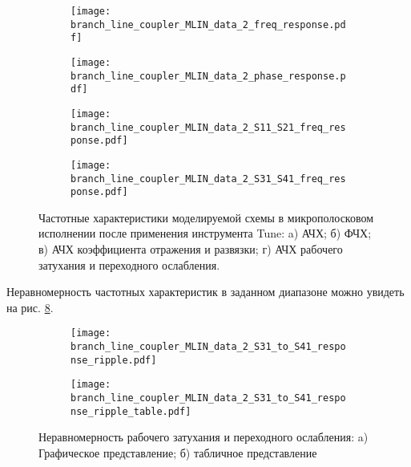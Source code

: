 \begin{figure}[!ht]
    \centering
    \begin{subfigure}[b]{0.45\textwidth}
        \centering
        \texttt{[image: branch\_line\_coupler\_MLIN\_data\_2\_freq\_response.pdf]}
        \caption{}
        \label{fig:branch_line_coupler_MLIN_data_2_freq_response}
    \end{subfigure}
    \hfill
    \begin{subfigure}[b]{0.45\textwidth}
        \centering
        \texttt{[image: branch\_line\_coupler\_MLIN\_data\_2\_phase\_response.pdf]}
        \caption{}
        \label{fig:branch_line_coupler_MLIN_data_2_phase_response}
    \end{subfigure}
    \vfill
    \begin{subfigure}[b]{0.45\textwidth}
        \centering
        \texttt{[image: branch\_line\_coupler\_MLIN\_data\_2\_S11\_S21\_freq\_response.pdf]}
        \caption{}
        \label{fig:branch_line_coupler_MLIN_data_2_S11_S21_freq_response}
    \end{subfigure}
    \hfill
    \begin{subfigure}[b]{0.45\textwidth}
        \centering
        \texttt{[image: branch\_line\_coupler\_MLIN\_data\_2\_S31\_S41\_freq\_response.pdf]}
        \caption{}
        \label{fig:branch_line_coupler_MLIN_data_2_S31_S41_freq_response}
    \end{subfigure}
    \caption{
        Частотные характеристики моделируемой схемы в микрополосковом исполнении после применения инструмента Tune:
        a) АЧХ;
        б) ФЧХ;
        в) АЧХ коэффициента отражения и развязки;
        г) АЧХ рабочего затухания и переходного ослабления.
    }
    \label{fig:branch_line_coupler_MLIN_data_2}
\end{figure}

Неравномерность частотных характеристик в заданном диапазоне можно увидеть на рис. \ref{fig:branch_line_coupler_MLIN_data_2_response_ripple}.

\begin{figure}[!ht]
    \centering
    \begin{subfigure}[b]{0.6\textwidth}
        \centering
        \texttt{[image: branch\_line\_coupler\_MLIN\_data\_2\_S31\_to\_S41\_response\_ripple.pdf]}
        \caption{}
        \label{fig:branch_line_coupler_MLIN_data_2_S31_to_S41_response_ripple}
    \end{subfigure}
    \vfill
    \begin{subfigure}[b]{0.6\textwidth}
        \centering
        \texttt{[image: branch\_line\_coupler\_MLIN\_data\_2\_S31\_to\_S41\_response\_ripple\_table.pdf]}
        \caption{}
        \label{fig:branch_line_coupler_MLIN_data_2_S31_to_S41_response_ripple_table}
    \end{subfigure}
    \caption{
        Неравномерность рабочего затухания и переходного ослабления:
        a) Графическое представление;
        б) табличное представление
    }
    \label{fig:branch_line_coupler_MLIN_data_2_response_ripple}
\end{figure}

